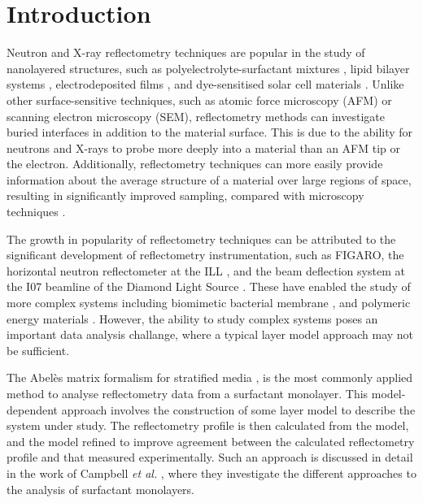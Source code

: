 \documentclass[amsmath,amssymb,twocolumn,superscriptaddress,aps,prl]{revtex4-1}
\begin{document}
\maketitle                        %

\section{Introduction}

Neutron and X-ray reflectometry techniques are popular in the study of nanolayered structures, such as polyelectrolyte-surfactant mixtures \cite{Llamas2018}, lipid bilayer systems \cite{Waldie2018}, electrodeposited films \cite{Beebee2019}, and dye-sensitised solar cell materials \cite{McCreeGrey2015}.
Unlike other surface-sensitive techniques, such as atomic force microscopy (AFM) or scanning electron microscopy (SEM), reflectometry methods can investigate buried interfaces in addition to the material surface.
This is due to the ability for neutrons and X-rays to probe more deeply into a material than an AFM tip or the electron.
Additionally, reflectometry techniques can more easily provide information about the average structure of a material over large regions of space, resulting in significantly improved sampling, compared with microscopy techniques \cite{Renaud2009}.

The growth in popularity of reflectometry techniques can be attributed to the significant development of reflectometry instrumentation, such as FIGARO, the horizontal neutron reflectometer at the ILL \cite{Campbell2011}, and the beam deflection system at the I07 beamline of the Diamond Light Source \cite{Arnold2012}.
These have enabled the study of more complex systems including biomimetic bacterial membrane \cite{Barker2016}, and polymeric energy materials \cite{Khodakarimi2016}.
However, the ability to study complex systems poses an important data analysis challange, where a typical layer model approach may not be sufficient.

The Abel\`{e}s matrix formalism for stratified media \cite{Abeles1950}, is the most commonly applied method to analyse reflectometry data from a surfactant monolayer.
This model-dependent approach involves the construction of some layer model to describe the system under study.
The reflectometry profile is then calculated from the model, and the model refined to improve agreement between the calculated reflectometry profile and that measured experimentally.
Such an approach is discussed in detail in the work of Campbell \emph{et al.} \cite{Campbell2018}, where they investigate the different approaches to the analysis of surfactant monolayers.
\end{document}
